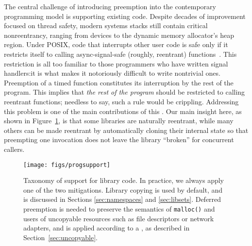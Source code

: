 The central challenge of introducing preemption into the contemporary programming
model is supporting existing code.  Despite decades of improvement focused on thread
safety, modern systems stacks still contain critical nonreentrancy, ranging from
devices to the dynamic memory allocator's heap region.
Under POSIX, code that interrupts other user code is safe only if it restricts
itself to calling async-signal-safe (roughly, reentrant)
functions~\cite{signal-safety-manpage}.  This restriction is all too familiar to
those programmers who have written signal handlers:\@ it is what makes it notoriously
difficult to write nontrivial ones.  Preemption of a timed function constitutes its
interruption by the rest of the program.  This implies that \textit{the rest of the
program} should be restricted to calling reentrant functions; needless to say, such
a rule would be crippling.  Addressing this problem is one of the main contributions
of this \paper.  Our main insight here, as shown in Figure~\ref{fig:progsupport}, is
that some libraries are naturally reentrant, while many others can be made reentrant
by automatically cloning their internal state so that preempting one invocation does
not leave the library ``broken'' for concurrent callers.

\begin{figure}
\texttt{[image: figs/progsupport]}
\caption{Taxonomy of support for library code.  \textnormal{In practice, we always
apply one of the two mitigations.  Library copying is used by default, and is
discussed in Sections \ref{sec:namespaces} and \ref{sec:libsets}.  Deferred
preemption is needed to preserve the semantics of \texttt{malloc()} and users of
uncopyable resources such as file descriptors or network adapters, and is applied
according to a \whitelist, as described in Section~\ref{sec:uncopyable}.}}
\label{fig:progsupport}
\end{figure}

